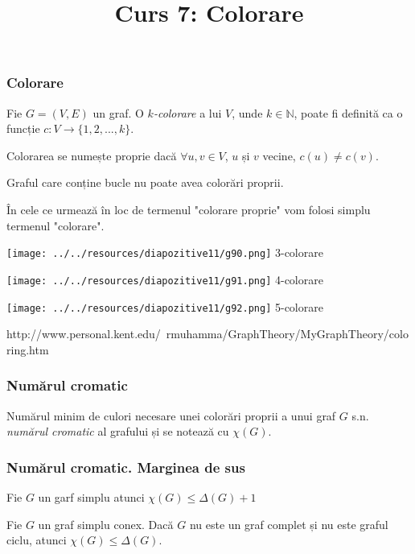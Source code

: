 \title{Curs 7: Colorare}



\maketitle

\begin{frame}
 \frametitle{Colorare}

\begin{definition}
Fie $G=(V,E)$ un graf. O \emph{$k$-colorare} a lui $V$, unde $k\in\mathbb{N}$, poate fi definită 
ca o funcție $c:V\to\{1,2,...,k\}$.
\end{definition}

Colorarea se numește proprie dacă $\forall u,v\in V$, $u$ și $v$ vecine, 
$c(u)\neq c(v)$. 

Graful care conține bucle nu poate avea colorări proprii.

\end{frame}

\begin{frame}
 În cele ce urmează în loc de termenul "colorare proprie" vom 
folosi simplu termenul "colorare".

\end{frame}

\begin{frame}
\texttt{[image: ../../resources/diapozitive11/g90.png]} 
3-colorare

\pause
\texttt{[image: ../../resources/diapozitive11/g91.png]}
4-colorare

\pause
\texttt{[image: ../../resources/diapozitive11/g92.png]}
5-colorare

{\tiny http://www.personal.kent.edu/~rmuhamma/GraphTheory/MyGraphTheory/coloring.htm}
\end{frame}


\begin{frame}
  \frametitle{Numărul cromatic}

Numărul minim de culori necesare unei colorări proprii a unui graf $G$ s.n. 
\emph{numărul cromatic} al grafului și se notează cu $\chi(G)$.

\end{frame}

\begin{frame}
  \frametitle{Numărul cromatic. Marginea de sus}

\begin{theorem}
Fie $G$ un garf simplu atunci $\chi(G)\leq \Delta(G)+1$
\end{theorem}
\pause

\begin{theorem}[Brook]
Fie $G$ un graf simplu conex. Dacă $G$ nu este un graf complet și nu este graful ciclu, atunci 
 $\chi(G)\leq \Delta(G)$.
\end{theorem}

 
\end{frame}



